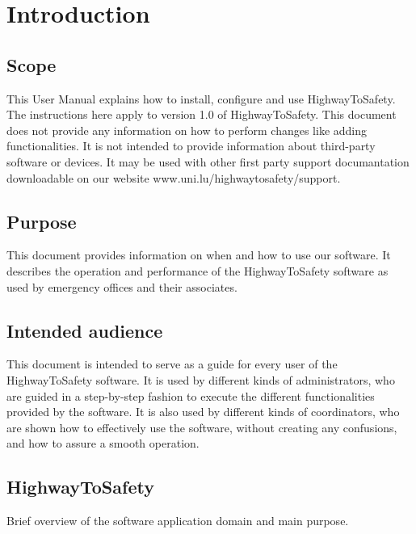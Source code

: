 \chapter{Introduction}
\label{chap:introduction}

\section{Scope}
This User Manual explains how to install, configure and use HighwayToSafety. The
instructions here apply to version 1.0 of HighwayToSafety.
This document does not provide any information on how to perform changes like
adding functionalities. It is not intended to provide information about
third-party software or devices.
It may be used with other first party support documantation
downloadable on our website www.uni.lu/highwaytosafety/support.
 
\section{Purpose}
This document provides information on when and how to use our software. It
describes the operation and performance of the HighwayToSafety software as used
by emergency offices and their associates.
\section{Intended audience}
This document is intended to serve as a guide for every user of the
HighwayToSafety software. It is used by different kinds of administrators, who
are guided in a step-by-step fashion to execute the different functionalities
provided by the software.
It is also used by different kinds of coordinators, who are shown how to
effectively use the software, without creating any confusions, and how to assure
a smooth operation.

\section{HighwayToSafety}
Brief overview of the software application domain and main purpose.


